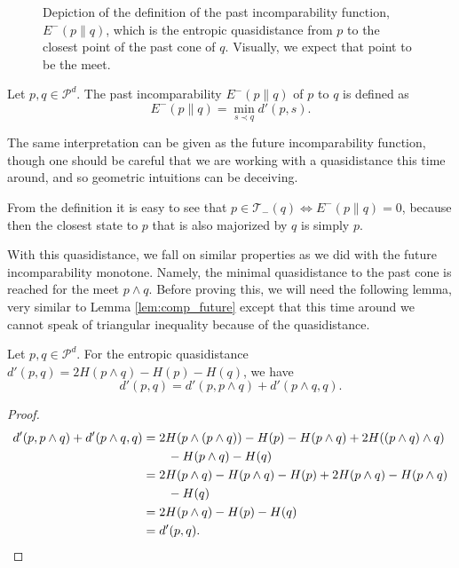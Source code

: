 \begin{figure}[h!]
\begin{tikzpicture}[scale=0.9]
    \end{tikzpicture}
    \caption{Depiction of the definition of the past incomparability function, $E^-(p \parallel q)$, which is the entropic quasidistance from $p$ to the closest point of the past cone of $q$. Visually, we expect that point to be the meet.}
    \label{fig:past_closest_intuition}
\end{figure}

\begin{definition}
    Let $p, q \in \mathcal{P}^d$. The past incomparability $E^-(p \parallel q)$ of $p$ to $q$ is defined as
    \begin{equation}
        E^- (p \parallel q) = \min_{s \prec q} d'(p, s).
    \end{equation}
\end{definition}

The same interpretation can be given as the future incomparability function, though one should be careful that we are working with a quasidistance this time around, and so geometric intuitions can be deceiving.

\begin{remark}
    From the definition it is easy to see that $p \in \mathcal{T}_-(q) \iff E^-(p \parallel q) = 0$, because then the closest state to $p$ that is also majorized by $q$ is simply $p$.
\end{remark}

With this quasidistance, we fall on similar properties as we did with the future incomparability monotone. Namely, the minimal quasidistance to the past cone is reached for the meet $p \wedge q$. Before proving this, we will need the following lemma, very similar to Lemma \ref{lem:comp_future} except that this time around we cannot speak of triangular inequality because of the quasidistance.

\begin{lemma} \label{lem:comp_past}
    Let $p, q \in \mathcal{P}^d$. For the entropic quasidistance $d'(p, q) = 2H(p \wedge q) - H(p) - H(q)$, we have
    \begin{equation}
        d'(p, q) = d'(p, p \wedge q) + d'(p \wedge q, q).
    \end{equation}
\end{lemma}

\begin{proof}
    \begin{align}
        d'(p, p \wedge q) + d'(p \wedge q, q) &= 2H(p \wedge (p \wedge q)) - H(p) - H(p \wedge q) + 2H((p \wedge q) \wedge q) \nonumber\\
        &\quad \quad - H(p \wedge q) - H(q)\\
        &= 2H(p \wedge q) - H(p \wedge q) - H(p) + 2H(p \wedge q) - H(p \wedge q)\nonumber\\
        &\quad \quad - H(q) \\
        &= 2H(p \wedge q) - H(p) - H(q) \\
        &= d'(p, q). \qedhere
    \end{align} 
\end{proof}

